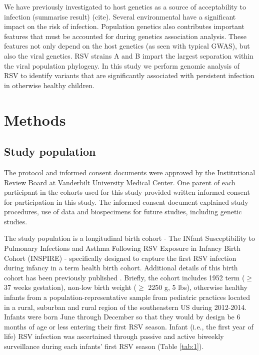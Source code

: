 \documentclass{article}
\begin{document}
We have previously investigated to host genetics as a source of acceptability to infection (summarise result) (cite).
Several environmental have a significant impact on the risk of infection. 
Population genetics also contributes important features that must be accounted for during genetics association analysis. 
These features not only depend on the host genetics (as seen with typical GWAS), but also the viral genetics.
RSV strains A and B impart the largest separation within the viral population phylogeny.
In this study we perform genomic analysis of RSV to identify variants that are significantly associated with persistent infection in otherwise healthy children. 

\section{Methods}
\subsection{Study population}
The protocol and informed consent documents were approved by the Institutional Review Board at Vanderbilt University Medical Center. 
One parent of each participant in the cohorts used for this study provided written informed consent for participation in this study. 
The informed consent document explained study procedures, use of data and biospecimens for future studies, including genetic studies.

The study population is a longitudinal birth cohort - The INfant Susceptibility to Pulmonary Infections and Asthma Following RSV Exposure in Infancy Birth Cohort (INSPIRE) - specifically designed to capture the first RSV infection during infancy in a term health birth cohort. 
Additional details of this birth cohort has been previously published 
\cite{larkin_objectives_2015}.
Briefly, the cohort includes 1952 term ($\ge$ 37 weeks gestation), non-low birth weight ($\ge$ 2250 g, 5 lbs), otherwise healthy infants from a population-representative sample from pediatric practices located in a rural, suburban and rural region of the southeastern US during 2012-2014. 
Infants were born June through December so that they would by design be 6 months of age or less entering their first RSV season. 
Infant (i.e., the first year of life) RSV infection was ascertained through passive and active biweekly surveillance during each infants' first RSV season
(Table \ref{tab:1}).
\end{document}
